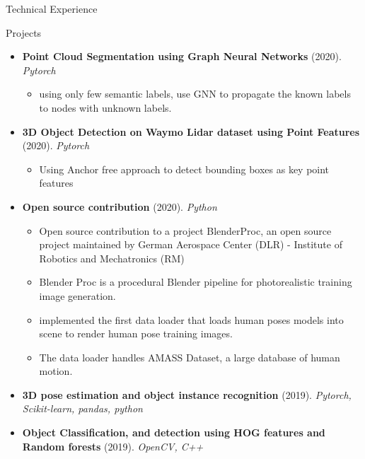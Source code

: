 \documentclass[]{mcdowellcv}
\begin{document}
	\begin{cvsection}{Technical Experience}
		\begin{cvsubsection}{Projects}{}{}
			\begin{itemize}
				\item \textbf{Point Cloud Segmentation using Graph Neural Networks} (2020). \textit{Pytorch}
					\begin{itemize}
						\item using only few semantic labels, use GNN to propagate the known labels to nodes with unknown labels.
					\end{itemize}
				\item \textbf{3D Object Detection on Waymo Lidar dataset using Point Features} (2020). \textit{Pytorch}
					\begin{itemize}
						\item Using Anchor free approach to detect bounding boxes as key point features
					\end{itemize}
				\item \textbf{Open source contribution} (2020). \textit{Python}
				\begin{itemize}
					\item Open source contribution to a project BlenderProc, an open source project maintained by German Aerospace Center (DLR) - Institute of Robotics and Mechatronics (RM)
					\item Blender Proc is a procedural Blender pipeline for photorealistic training image generation.
					\item implemented the first data loader that loads human poses models into scene to render human pose training images.
					\item The data loader handles AMASS Dataset, a large database of human motion. 
				\end{itemize}
				\item \textbf{3D pose estimation and object instance recognition} (2019). \textit{Pytorch, Scikit-learn, pandas, python}
				\item \textbf{Object Classification, and detection using HOG features and Random forests} (2019). \textit{OpenCV, C++}
			\end{itemize}
		\end{cvsubsection}		
	\end{cvsection}
	
\end{document}
